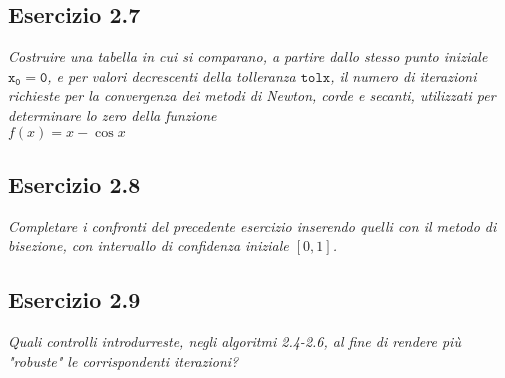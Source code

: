 \subsection{Esercizio 2.7}
\emph{Costruire una tabella in cui si comparano, a partire dallo stesso punto iniziale $\mathtt{x_{0} = 0}$, e per valori decrescenti della tolleranza $\mathtt{tolx}$, il numero di iterazioni richieste per la convergenza dei metodi di Newton, corde e secanti, utilizzati per determinare lo zero della funzione\\}
\center $f(x) = x - \cos{x}$
\flushleft
\subsection{Esercizio 2.8}
\emph{Completare i confronti del precedente esercizio inserendo quelli con il metodo di bisezione, con intervallo di confidenza iniziale $ [0,1]$.}
\subsection{Esercizio 2.9}
\emph{Quali controlli introdurreste, negli algoritmi 2.4-2.6, al fine di rendere più "robuste" le corrispondenti iterazioni?}
